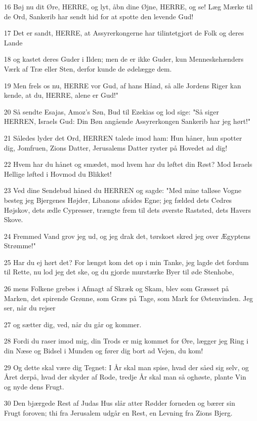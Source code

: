 \par 16 Bøj nu dit Øre, HERRE, og lyt, åbn dine Øjne, HERRE, og se! Læg Mærke til de Ord, Sankerib har sendt hid for at spotte den levende Gud!
\par 17 Det er sandt, HERRE, at Assyrerkongerne har tilintetgjort de Folk og deres Lande
\par 18 og kastet deres Guder i Ilden; men de er ikke Guder, kun Menneskehænders Værk af Træ eller Sten, derfor kunde de ødelægge dem.
\par 19 Men frels os nu, HERRE vor Gud, af hans Hånd, så alle Jordens Riger kan kende, at du, HERRE, alene er Gud!"
\par 20 Så sendte Esajas, Amoz's Søn, Bud til Ezekias og lod sige: "Så siger HERREN, Israels Gud: Din Bøn angående Assyrerkongen Sankerib har jeg hørt!"
\par 21 Således lyder det Ord, HERREN talede imod ham: Hun håner, hun spotter dig, Jomfruen, Zions Datter, Jerusalems Datter ryster på Hovedet ad dig!
\par 22 Hvem har du hånet og smædet, mod hvem har du løftet din Røst? Mod Israels Hellige løfted i Hovmod du Blikket!
\par 23 Ved dine Sendebud håned du HERREN og sagde: "Med mine talløse Vogne besteg jeg Bjergenes Højder, Libanons afsides Egne; jeg fælded dets Cedres Højskov, dets ædle Cypresser, trængte frem til dets øverste Raststed, dets Havers Skove.
\par 24 Fremmed Vand grov jeg ud, og jeg drak det, tørskoet skred jeg over Ægyptens Strømme!"
\par 25 Har du ej hørt det? For længst kom det op i min Tanke, jeg lagde det fordum til Rette, nu lod jeg det ske, og du gjorde murstærke Byer til øde Stenhobe,
\par 26 mens Folkene grebes i Afmagt af Skræk og Skam, blev som Græsset på Marken, det spirende Grønne, som Græs på Tage, som Mark for Østenvinden. Jeg ser, når du rejser
\par 27 og sætter dig, ved, når du går og kommer.
\par 28 Fordi du raser imod mig, din Trods er mig kommet for Øre, lægger jeg Ring i din Næse og Bidsel i Munden og fører dig bort ad Vejen, du kom!
\par 29 Og dette skal være dig Tegnet: I År skal man spise, hvad der såed sig selv, og Året derpå, hvad der skyder af Rode, tredje År skal man så oghøste, plante Vin og nyde dens Frugt.
\par 30 Den bjærgede Rest af Judas Hus slår atter Rødder forneden og bærer sin Frugt foroven; thi fra Jerusalem udgår en Rest, en Levning fra Zions Bjerg.
